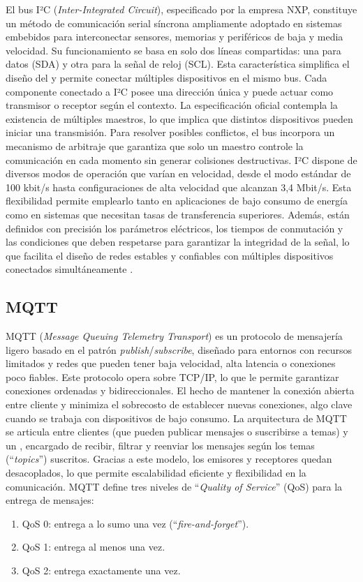 El bus I²C (\textit{Inter-Integrated Circuit}), especificado por la empresa NXP, constituye un método de comunicación serial síncrona ampliamente adoptado en sistemas embebidos para interconectar sensores, memorias y periféricos de baja y media velocidad. Su funcionamiento se basa en solo dos líneas compartidas: una para datos (SDA) y otra para la señal de reloj (SCL). Esta característica simplifica el diseño del  y permite conectar múltiples dispositivos en el mismo bus.
Cada componente conectado a I²C posee una dirección única y puede actuar como transmisor o receptor según el contexto. La especificación oficial contempla la existencia de múltiples maestros, lo que implica que distintos dispositivos pueden iniciar una transmisión. Para resolver posibles conflictos, el bus incorpora un mecanismo de arbitraje que garantiza que solo un maestro controle la comunicación en cada momento sin generar colisiones destructivas.
I²C dispone de diversos modos de operación que varían en velocidad, desde el modo estándar de 100 kbit/s hasta configuraciones de alta velocidad que alcanzan 3,4 Mbit/s. Esta flexibilidad permite emplearlo tanto en aplicaciones de bajo consumo de energía como en sistemas que necesitan tasas de transferencia superiores. Además, están definidos con precisión los parámetros eléctricos, los tiempos de conmutación y las condiciones que deben respetarse para garantizar la integridad de la señal, lo que facilita el diseño de redes estables y confiables con múltiples dispositivos conectados simultáneamente \cite{i2cNXP}.

\subsection{MQTT}

MQTT (\textit{Message Queuing Telemetry Transport}) es un protocolo de mensajería ligero basado en el patrón \textit{publish}/\textit{subscribe}, diseñado para entornos con recursos limitados y redes que pueden tener baja velocidad, alta latencia o conexiones poco fiables. 
Este protocolo opera sobre TCP/IP, lo que le permite garantizar conexiones ordenadas y bidireccionales. 
El hecho de mantener la conexión abierta entre cliente y  minimiza el sobrecosto de establecer nuevas conexiones, algo clave cuando se trabaja con dispositivos de bajo consumo. 
La arquitectura de MQTT se articula entre clientes (que pueden publicar mensajes o suscribirse a temas) y un , encargado de recibir, filtrar y reenviar los mensajes según los temas (“\textit{topics}”) suscritos. 
Gracias a este modelo, los emisores y receptores quedan desacoplados, lo que permite escalabilidad eficiente y flexibilidad en la comunicación. MQTT define tres niveles de “\textit{Quality of Service}” (QoS) para la entrega de mensajes:
\begin{enumerate}
    \item QoS 0: entrega a lo sumo una vez (“\textit{fire-and-forget}”).
    \item QoS 1: entrega al menos una vez.
    \item QoS 2: entrega exactamente una vez. 
\end{enumerate}


